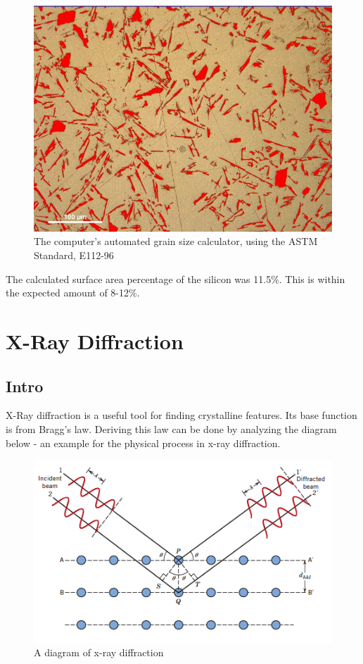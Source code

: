 \documentclass{article}
\begin{document}
\begin{figure}[h]
	\centering
	\includegraphics[scale=.3]{hyperu.png}
	\caption{The computer's automated grain size calculator, using the ASTM Standard, E112-96}
\end{figure}

The calculated surface area percentage of the silicon was 11.5\%. This is within the expected amount of 8-12\%.

\section{X-Ray Diffraction}

\subsection{Intro}

X-Ray diffraction is a useful tool for finding crystalline features. Its base function is from Bragg's law. Deriving this law can be done by analyzing the diagram below - an example for the physical process in x-ray diffraction.

\begin{figure}[h]
	\centering
	\includegraphics[scale=.6]{bragg.png}
	\caption{A diagram of x-ray diffraction}
\end{figure}
\end{document}
